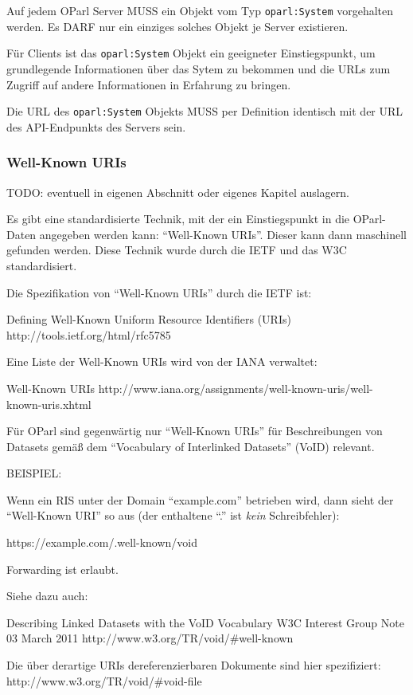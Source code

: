 \documentclass[,a4paper]{article}
\begin{document}
Auf jedem OParl Server MUSS ein Objekt vom Typ \texttt{oparl:System}
vorgehalten werden. Es DARF nur ein einziges solches Objekt je Server
existieren.

Für Clients ist das \texttt{oparl:System} Objekt ein geeigneter
Einstiegspunkt, um grundlegende Informationen über das Sytem zu bekommen
und die URLs zum Zugriff auf andere Informationen in Erfahrung zu
bringen.

Die URL des \texttt{oparl:System} Objekts MUSS per Definition identisch
mit der URL des API-Endpunkts des Servers sein.

\subsubsection{Well-Known URIs}\label{well-known-uris}

TODO: eventuell in eigenen Abschnitt oder eigenes Kapitel auslagern.

Es gibt eine standardisierte Technik, mit der ein Einstiegspunkt in die
OParl-Daten angegeben werden kann: ``Well-Known URIs''. Dieser kann dann
maschinell gefunden werden. Diese Technik wurde durch die IETF und das
W3C standardisiert.

Die Spezifikation von ``Well-Known URIs'' durch die IETF ist:

Defining Well-Known Uniform Resource Identifiers (URIs)
http://tools.ietf.org/html/rfc5785

Eine Liste der Well-Known URIs wird von der IANA verwaltet:

Well-Known URIs
http://www.iana.org/assignments/well-known-uris/well-known-uris.xhtml

Für OParl sind gegenwärtig nur ``Well-Known URIs'' für Beschreibungen
von Datasets gemäß dem ``Vocabulary of Interlinked Datasets'' (VoID)
relevant.

BEISPIEL:

Wenn ein RIS unter der Domain ``example.com'' betrieben wird, dann sieht
der ``Well-Known URI'' so aus (der enthaltene ``.'' ist \emph{kein}
Schreibfehler):

https://example.com/.well-known/void

Forwarding ist erlaubt.

Siehe dazu auch:

Describing Linked Datasets with the VoID Vocabulary W3C Interest Group
Note 03 March 2011 http://www.w3.org/TR/void/\#well-known

Die über derartige URIs dereferenzierbaren Dokumente sind hier
spezifiziert: http://www.w3.org/TR/void/\#void-file
\end{document}
